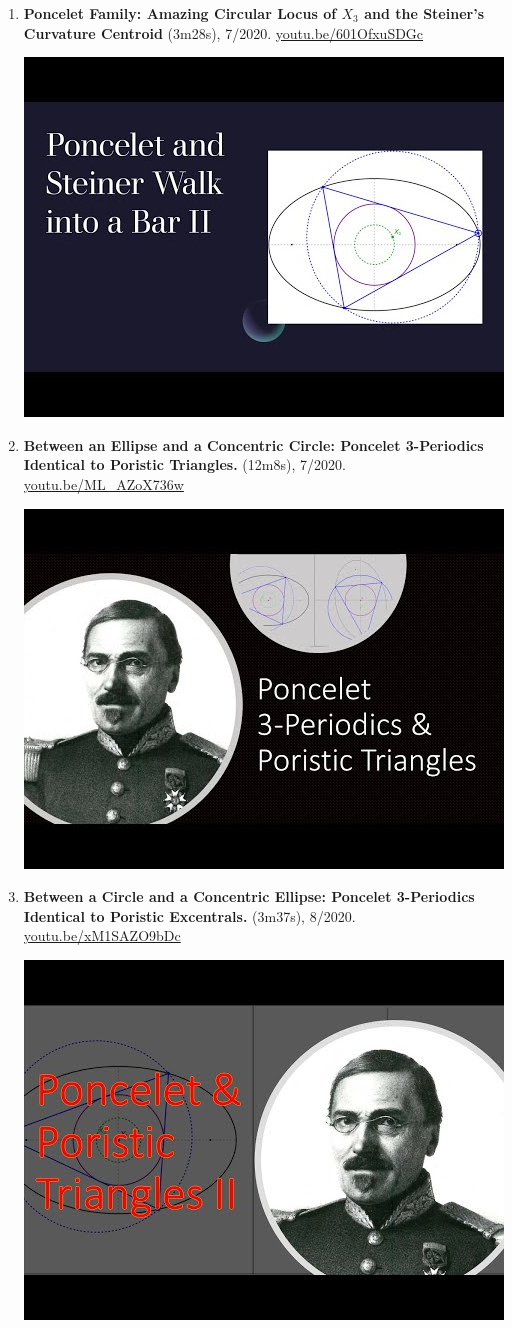 \documentclass[12pt]{article}
\begin{document}
\begin{enumerate}[resume]
% 
\item \textbf{Poncelet Family: Amazing Circular Locus of $X_{3}$ and the Steiner's Curvature Centroid} (3m28s), 7/2020. \href{https://youtu.be/601OfxuSDGc}{\url{youtu.be/601OfxuSDGc}}
\begin{center}\includegraphics[width=.5\textwidth]{pics/601OfxuSDGc.jpg}\end{center}
% 
\item \textbf{Between an Ellipse and a Concentric Circle: Poncelet 3-Periodics Identical to Poristic Triangles.} (12m8s), 7/2020. \href{https://youtu.be/ML_AZoX736w}{\url{youtu.be/ML\_AZoX736w}}
\begin{center}\includegraphics[width=.5\textwidth]{pics/ML_AZoX736w.jpg}\end{center}
% 
\item \textbf{Between a Circle and a Concentric Ellipse: Poncelet 3-Periodics Identical to Poristic Excentrals.} (3m37s), 8/2020. \href{https://youtu.be/xM1SAZO9bDc}{\url{youtu.be/xM1SAZO9bDc}}
\begin{center}\includegraphics[width=.5\textwidth]{pics/xM1SAZO9bDc.jpg}\end{center}

\end{enumerate}
\end{document}
